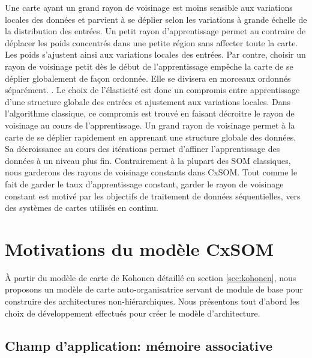 \documentclass[../main]{subfiles}
\begin{document}
Une carte ayant un grand rayon de voisinage est moins sensible aux variations locales des données et parvient à se déplier selon les variations à grande échelle de la distribution des entrées.
Un petit rayon d'apprentissage permet au contraire de déplacer les poids concentrés dans une petite région sans affecter toute la carte. Les poids s'ajustent ainsi aux variations locales des entrées. Par contre, choisir un rayon de voisinage petit dès le début de l'apprentissage empêche la carte de se déplier globalement de façon ordonnée. Elle se divisera en morceaux ordonnés séparément. \parencite{Kohonen1995SelfOrganizingM}.
Le choix de l'élasticité est donc un compromis entre apprentissage d'une structure globale des entrées et ajustement aux variations locales.
Dans l'algorithme classique, ce compromis est trouvé en faisant décroitre le rayon de voisinage au cours de l'apprentissage. Un grand rayon de voisinage permet à la carte de se déplier rapidement en apprenant une structure globale des données. Sa décroissance au cours des itérations permet d'affiner l'apprentissage des données à un niveau plus fin. 
Contrairement à la plupart des SOM classiques, nous garderons des rayons de voisinage constants dans CxSOM. Tout comme le fait de garder le taux d'apprentissage constant, garder le rayon de voisinage constant est motivé par les objectifs de traitement de données séquentielles, vers des systèmes de cartes utilisés en continu.

\section{Motivations du modèle CxSOM}

\`A partir du modèle de carte de Kohonen détaillé en section \ref{sec:kohonen}, nous proposons un modèle de carte auto-organisatrice servant de module de base pour construire des architectures non-hiérarchiques. 
Nous présentons tout d'abord les choix de développement effectués pour créer le modèle d'architecture.

\subsection{Champ d'application: mémoire associative}
\end{document}
